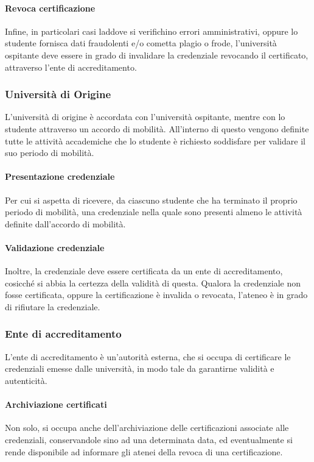\documentclass[a4paper,12pt]{article}
\begin{document}
\paragraph{Revoca certificazione} Infine, in particolari casi laddove si verifichino errori amministrativi, oppure lo studente fornisca dati fraudolenti e/o cometta plagio o frode, l'università ospitante deve essere in grado di invalidare la credenziale revocando il certificato, attraverso l'ente di accreditamento.

\subsubsection{Università di Origine}
L'università di origine è accordata con l'università ospitante, mentre con lo studente attraverso un accordo di mobilità. All'interno di questo vengono definite tutte le attività accademiche che lo studente è richiesto soddisfare per validare il suo periodo di mobilità.
\paragraph{Presentazione credenziale} Per cui si aspetta di ricevere, da ciascuno studente che ha terminato il proprio periodo di mobilità, una credenziale nella quale sono presenti almeno le attività definite dall'accordo di mobilità.
\paragraph{Validazione credenziale} Inoltre, la credenziale deve essere certificata da un ente di accreditamento, cosicché si abbia la certezza della validità di questa. Qualora la credenziale non fosse certificata, oppure la certificazione è invalida o revocata, l'ateneo è in grado di rifiutare la credenziale.
\subsubsection{Ente di accreditamento}
L'ente di accreditamento è un'autorità esterna, che si occupa di certificare le credenziali emesse dalle università, in modo tale da garantirne validità e autenticità. 
\paragraph{Archiviazione certificati}Non solo, si occupa anche dell'archiviazione delle certificazioni associate alle credenziali, conservandole sino ad una determinata data, ed eventualmente si rende disponibile ad informare gli atenei della revoca di una certificazione.
\end{document}

